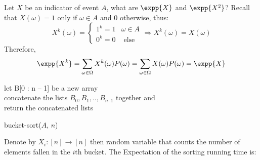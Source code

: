 \begin{example} Let $X$ be an indicator of event $A$, what are $\expp{X}$ and $\expp{X^{2}}$? Recall that $X(\omega) = 1$ only if $\omega \in A$ and $0$ otherwise, thus: 
  \begin{equation*}
    X^{k}(\omega) = \begin{cases}
      1^{k} = 1 & \omega \in A \\
      0^{k} = 0 & \text{ else }
    \end{cases} \Rightarrow X^{k}(\omega) = X(\omega)
  \end{equation*}
  Therefore, 
  \begin{equation*}
    \begin{split}
      \expp{X^{k}} = \sum_{\omega \in \Omega}{ X^{k}(\omega)  P(\omega)  } = \sum_{\omega \in \Omega}{ X(\omega)  P(\omega)  }=\expp{X} 
    \end{split}
  \end{equation*}
\end{example}
\begin{example}
\end{example}

\begin{algorithm}
    	let B[0 : n – 1] be a new array \\
	\For{ $i \leftarrow [1, n]$}{
	    insert $A_{i}$ into list $B_{ \lfloor n A_{i} \rfloor} ]$
       	}
	concatenate the lists $B_{0}, B_{1}, .. , B_{n – 1}$ together and\\
	return the concatenated lists
\caption{bucket-sort($A$, $n$)}
  \end{algorithm}

  Denote by $X_{i} : [n] \rightarrow [n]$ then random variable that counts the number of elements fallen in the $i$th bucket. The Expectation of the sorting running time is:   
  
